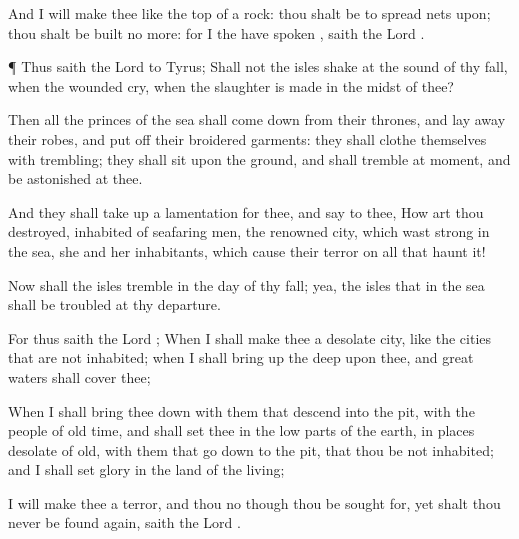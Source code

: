 {And I will
make thee like the
top of a
rock: thou shalt be
{} to
spread
nets
upon; thou shalt be
built no more: for I the
{} have
spoken
{},
saith the
Lord
{}.


\par }{\PP {}¶ Thus
saith the
Lord
{} to
Tyrus; Shall not the
isles
shake at the
sound of thy
fall, when the
wounded
cry, when the
slaughter is
made in the
midst of thee?

Then all the
princes of the
sea shall come
down from their
thrones, and lay
away their
robes, and put
off their
broidered
garments: they shall
clothe themselves with
trembling; they shall
sit upon the
ground, and shall
tremble at
{}
moment, and be
astonished at thee.

And they shall take
up a
lamentation for thee, and
say to thee, How art thou
destroyed,
{}
inhabited of seafaring
men, the
renowned
city, which wast
strong in the
sea, she and her
inhabitants, which
cause their
terror
{} on all that
haunt it!

Now shall the
isles
tremble in the
day of thy
fall; yea, the
isles that
{} in the
sea shall be
troubled at thy
departure.

For thus
saith the
Lord
{}; When I shall
make thee a
desolate
city, like the
cities that are not
inhabited; when I shall bring
up the
deep upon thee, and
great
waters shall
cover thee;

When I shall bring thee
down with them that
descend into the
pit, with the
people of old
time, and shall
set thee in the low
parts of the
earth, in places
desolate of
old, with them that go
down to the
pit, that thou be not
inhabited; and I shall
set
glory in the
land of the
living;

I will
make thee a
terror, and thou
{} no
{} though thou be sought
for, yet shalt thou
never be
found again,
saith the
Lord
{}.




\par }
